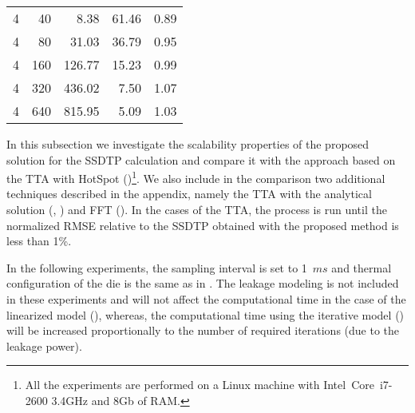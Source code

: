 \begin{table*}
{\begin{tabular}{|r|r|r|r|r|}
      4 &  40 &   8.38 & 61.46 & 0.89 \\
      4 &  80 &  31.03 & 36.79 & 0.95 \\
      4 & 160 & 126.77 & 15.23 & 0.99 \\
      4 & 320 & 436.02 &  7.50 & 1.07 \\
      4 & 640 & 815.95 &  5.09 & 1.03 \\
      \hline
    \end{tabular}
  }
  \vspace{-10pt}
\end{table*}
In this subsection we investigate the scalability properties of the proposed solution for the SSDTP calculation and compare it with the approach based on the TTA with HotSpot ()\footnote{All the experiments are performed on a Linux machine with Intel\textregistered\ Core\texttrademark\ i7-2600 3.4GHz and 8Gb of RAM.}. We also include in the comparison two additional techniques described in the appendix, namely the TTA with the analytical solution (, ) and FFT (). In the cases of the TTA, the process is run until the normalized RMSE relative to the SSDTP obtained with the proposed method is less than 1\%.

In the following experiments, the sampling interval is set to \mbox{1 $ms$} and thermal configuration of the die is the same as in . The leakage modeling is not included in these experiments and will not affect the computational time in the case of the linearized model (), whereas, the computational time using the iterative model () will be increased proportionally to the number of required iterations (due to the leakage power).

